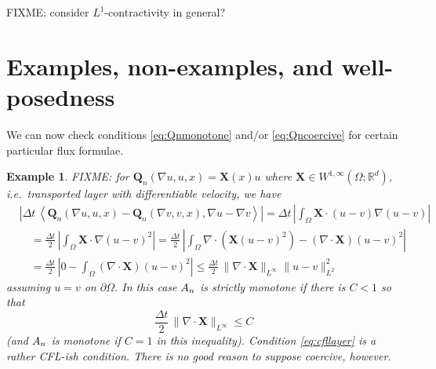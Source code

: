\documentclass[final,leqno,onefignum,onetabnum]{siamltex1213bueler}
\newtheorem{example}{Example}
\newcommand\bQ{\mathbf{Q}}
\newcommand\bX{\mathbf{X}}
\newcommand{\Div}{\nabla\cdot}
\renewcommand{\grad}{\nabla}
\newcommand{\ip}[2]{\ensuremath{\left<#1,#2\right>}}
\newcommand\RR{\mathbb{R}}
\begin{document}
FIXME: consider $L^1$-contractivity in general?


\section{Examples, non-examples, and well-posedness} \label{sec:examples}

We can now check conditions \eqref{eq:Qnmonotone} and/or \eqref{eq:Qncoercive} for certain particular flux formulae.

\begin{example} FIXME: for $\bQ_n(\grad u,u,x) = \bX(x) u$ where $\bX \in W^{1,\infty}(\Omega;\RR^d)$, i.e.~transported layer with differentiable velocity, we have
\begin{align*}
   &\left|\Delta t\,\ip{\bQ_n(\grad u,u,x) - \bQ_n(\grad v,v,x)}{\grad u - \grad v}\right| = \Delta t\,\left|\int_\Omega \bX \cdot (u-v) \grad (u - v)\right| \\
   &\quad = \frac{\Delta t}{2}\,\left|\int_\Omega \bX \cdot \grad (u - v)^2\right| = \frac{\Delta t}{2}\,\left|\int_\Omega \Div(\bX (u - v)^2) - (\Div\bX) (u-v)^2\right| \\
   &\quad = \frac{\Delta t}{2}\,\left|0 - \int_\Omega (\Div\bX) (u-v)^2\right| \le \frac{\Delta t}{2}\,\|\Div\bX\|_{L^\infty} \|u-v\|_{L^2}^2
\end{align*}
assuming $u=v$ on $\partial \Omega$.  In this case $A_{n}$ is strictly monotone if there is $C<1$ so that
\begin{equation}
\frac{\Delta t}{2}\,\|\Div\bX\|_{L^\infty} \le C \label{eq:cfllayer}
\end{equation}
(and $A_{n}$ is monotone if $C=1$ in this inequality).  Condition \eqref{eq:cfllayer} is a rather CFL-ish condition.  There is no good reason to suppose coercive, however.
\end{example}
\end{document}
